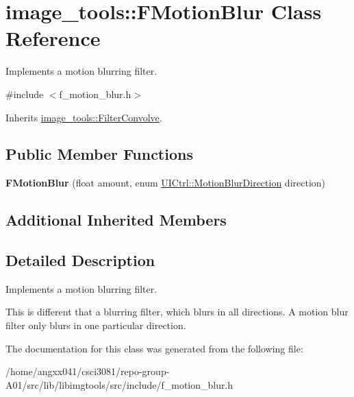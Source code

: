 \hypertarget{classimage__tools_1_1FMotionBlur}{}\section{image\+\_\+tools\+:\+:F\+Motion\+Blur Class Reference}
\label{classimage__tools_1_1FMotionBlur}


Implements a motion blurring filter.  




{\ttfamily \#include $<$f\+\_\+motion\+\_\+blur.\+h$>$}



Inherits \hyperlink{classimage__tools_1_1FilterConvolve}{image\+\_\+tools\+::\+Filter\+Convolve}.

\subsection*{Public Member Functions}
\begin{DoxyCompactItemize}
\item 
{\bfseries F\+Motion\+Blur} (float amount, enum \hyperlink{classimage__tools_1_1UICtrl_a56d4f68bf91302769d7bc453d8d57cee}{U\+I\+Ctrl\+::\+Motion\+Blur\+Direction} direction)\hypertarget{classimage__tools_1_1FMotionBlur_a1cb472dcd0a7d2a26fb81fbeeccb78c1}{}\label{classimage__tools_1_1FMotionBlur_a1cb472dcd0a7d2a26fb81fbeeccb78c1}

\end{DoxyCompactItemize}
\subsection*{Additional Inherited Members}


\subsection{Detailed Description}
Implements a motion blurring filter. 

This is different that a blurring filter, which blurs in all directions. A motion blur filter only blurs in one particular direction. 

The documentation for this class was generated from the following file\+:\begin{DoxyCompactItemize}
\item 
/home/angxx041/csci3081/repo-\/group-\/\+A01/src/lib/libimgtools/src/include/f\+\_\+motion\+\_\+blur.\+h\end{DoxyCompactItemize}
